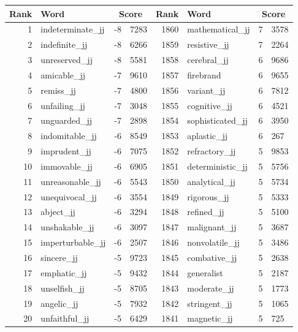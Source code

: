 \begin{table}[tbp]
    \begin{tabular}{| rlr@{.}l | rlr@{.}l |}
    \hline
    \textbf{Rank} & \textbf{Word} & \multicolumn{2}{c|}{\textbf{Score}} & \textbf{Rank} & \textbf{Word} & \multicolumn{2}{c|}{\textbf{Score}} \\
    \hline
    1 & indeterminate\_jj & -8 & 7283    &    1860 & mathematical\_jj & 7 & 3578 \\
    2 & indefinite\_jj & -8 & 6266    &    1859 & resistive\_jj & 7 & 2264 \\
    3 & unreserved\_jj & -8 & 5581    &    1858 & cerebral\_jj & 6 & 9686 \\
    4 & amicable\_jj & -7 & 9610    &    1857 & firebrand & 6 & 9655 \\
    5 & remiss\_jj & -7 & 4800    &    1856 & variant\_jj & 6 & 7812 \\
    6 & unfailing\_jj & -7 & 3048    &    1855 & cognitive\_jj & 6 & 4521 \\
    7 & unguarded\_jj & -7 & 2898    &    1854 & sophisticated\_jj & 6 & 3950 \\
    8 & indomitable\_jj & -6 & 8549    &    1853 & aplastic\_jj & 6 & 267 \\
    9 & imprudent\_jj & -6 & 7075    &    1852 & refractory\_jj & 5 & 9853 \\
    10 & immovable\_jj & -6 & 6905    &    1851 & deterministic\_jj & 5 & 5756 \\
    11 & unreasonable\_jj & -6 & 5543    &    1850 & analytical\_jj & 5 & 5734 \\
    12 & unequivocal\_jj & -6 & 3554    &    1849 & rigorous\_jj & 5 & 5333 \\
    13 & abject\_jj & -6 & 3294    &    1848 & refined\_jj & 5 & 5100 \\
    14 & unshakable\_jj & -6 & 3097    &    1847 & malignant\_jj & 5 & 3687 \\
    15 & imperturbable\_jj & -6 & 2507    &    1846 & nonvolatile\_jj & 5 & 3486 \\
    16 & sincere\_jj & -5 & 9723    &    1845 & combative\_jj & 5 & 2638 \\
    17 & emphatic\_jj & -5 & 9432    &    1844 & generalist & 5 & 2187 \\
    18 & unselfish\_jj & -5 & 8705    &    1843 & moderate\_jj & 5 & 1773 \\
    19 & angelic\_jj & -5 & 7932    &    1842 & stringent\_jj & 5 & 1065 \\
    20 & unfaithful\_jj & -5 & 6429    &    1841 & magnetic\_jj & 5 & 725 \\

\end{tabular}
\end{table}
